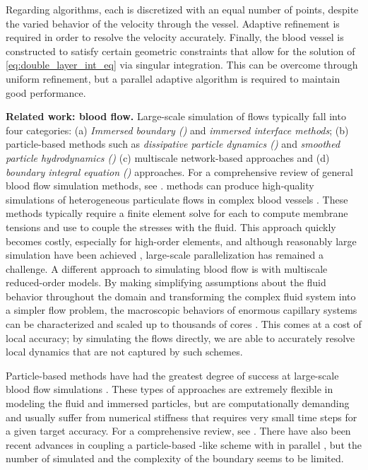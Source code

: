 Regarding algorithms, each \rbc is discretized with an equal number of points, despite the 
varied behavior of the velocity through the vessel. 
Adaptive refinement is required in order to resolve the velocity accurately.
Finally, the blood vessel is constructed to satisfy certain geometric
constraints that allow for the solution of \cref{eq:double_layer_int_eq} via
singular integration.
This can be overcome through uniform refinement, but a parallel adaptive
algorithm is required to maintain good performance. 

\textbf{Related work: blood flow. }
Large-scale simulation of \rbc flows typically fall into four
categories: (a) \textit{Immersed boundary (\ib)} and \textit{immersed
  interface methods}; (b) particle-based methods such as
\textit{dissipative particle dynamics (\dpd)} and \textit{smoothed
  particle hydrodynamics (\sph)} (c) multiscale network-based
approaches and (d) \textit{boundary integral equation (\bie)}
approaches.
For a comprehensive review of general blood flow simulation methods, see \cite{freund2014numerical}.
\ib methods can produce high-quality simulations of heterogeneous particulate flows in complex blood vessels \cite{balogh2017direct,balogh2017computational, xu2013large}.
These methods typically require a finite element solve for each \rbc to compute membrane tensions and use \ib to couple the stresses with the fluid. 
This approach quickly becomes costly, especially for high-order elements, and although reasonably large simulation have been achieved \cite{saadat2018immersed,saadat2019simulation}, large-scale parallelization has remained a challenge.
A different approach to simulating blood flow is with multiscale reduced-order models.
By making simplifying assumptions about the fluid behavior throughout the domain
and transforming the complex fluid system into a simpler flow problem, the
macroscopic behaviors of enormous capillary systems can be characterized 
\cite{peyrounette2018multiscale,perdikaris2016multiscale} and
scaled up to thousands of cores \cite{perdikaris2015effective}.
This comes at a cost of local accuracy; by simulating the flows directly, we are able to accurately resolve local \rbc dynamics that are not captured by such schemes.

Particle-based methods have had the greatest degree of success at large-scale blood flow simulations \cite{gounley2017computational,grinberg2011new,randles2015massively, rossinelli2015silico}. 
These types of approaches are extremely flexible in modeling the fluid and immersed particles, but are computationally demanding and usually suffer from numerical stiffness that requires very small time steps for a given target accuracy. For a comprehensive review, see \cite{ye2016particle}.
There have also been recent advances in coupling a particle-based
\dpd-like scheme with \ib in parallel \cite{ye2017hybrid,ye2018three},
but the number of \rbcs simulated and the complexity of the boundary seems to be limited.

